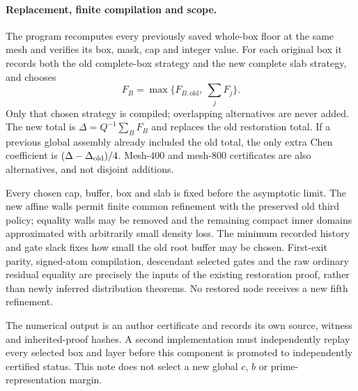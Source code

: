 \paragraph{Replacement, finite compilation and scope.}
The program recomputes every previously saved whole-box floor at
the same mesh and verifies its box, mask, cap and integer value.
For each original box it records both the old complete-box strategy
and the new complete slab strategy, and chooses
\[
 F_B=\max\{F_{B,\mathrm{old}},\ \sum_jF_j\}.
\]
Only that chosen strategy is compiled; overlapping alternatives
are never added.  The new total is $\Delta=Q^{-1}\sum_B F_B$ and
replaces the old restoration total.  If a previous global assembly
already included the old total, the only extra Chen coefficient
is $(\Delta-\Delta_{\rm old})/4$.  Mesh-$400$ and mesh-$800$
certificates are also alternatives, and not disjoint additions.

Every chosen cap, buffer, box and slab is fixed before the asymptotic
limit.  The new affine walls permit finite common refinement with
the preserved old third policy; equality walls may be removed and
the remaining compact inner domains approximated with arbitrarily
small density loss.  The minimum recorded history and gate slack
fixes how small the old root buffer may be chosen.  First-exit parity,
signed-atom compilation, descendant selected gates and the raw
ordinary residual equality are precisely the inputs of the existing
restoration proof, rather than newly inferred distribution theorems.
No restored node receives a new fifth refinement.

The numerical output is an author certificate and records its own
source, witness and inherited-proof hashes.  A second implementation
must independently replay every selected box and layer before this
component is promoted to independently certified status.  This note
does not select a new global $c$, $b$ or prime-representation margin.
